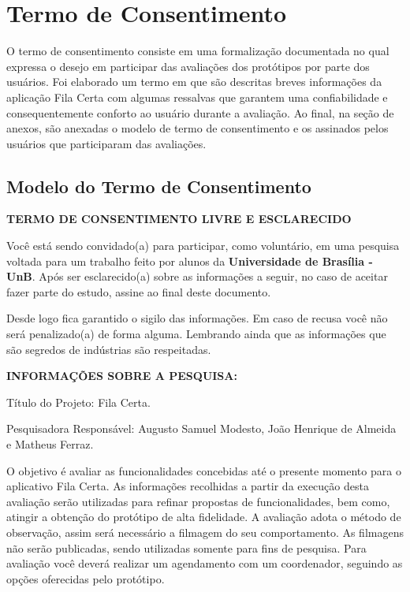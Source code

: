 \chapter[Termo de Consentimento]{Termo de Consentimento}
\label{chap:termoConsentimento}
	
	O termo de consentimento consiste em uma formalização documentada no qual expressa o desejo em participar das avaliações dos protótipos por parte dos usuários. Foi elaborado um termo em que são descritas breves informações da aplicação Fila Certa com algumas ressalvas que garantem uma confiabilidade e consequentemente conforto ao usuário durante a avaliação. Ao final, na seção de anexos, são anexadas o modelo de termo de consentimento e os assinados pelos usuários que participaram das avaliações. 

	\section[Modelo do Termo de Consentimento]{Modelo do Termo de Consentimento}
	\label{sec:termoConsentimento_modelo}

		\begin{center}
			\textbf{TERMO DE CONSENTIMENTO LIVRE E ESCLARECIDO}
		\end{center}

		Você está sendo convidado(a) para participar, como voluntário, em uma pesquisa voltada para um trabalho feito por alunos da \textbf{Universidade de Brasília - UnB}. Após ser esclarecido(a) sobre as informações a seguir, no caso de aceitar fazer parte do estudo, assine ao final deste documento.
		
		Desde logo fica garantido o sigilo das informações. Em caso de recusa você não será penalizado(a) de forma alguma. Lembrando ainda que as informações que são segredos de indústrias são respeitadas.

		\begin{center}
			\textbf{INFORMAÇÕES SOBRE A PESQUISA:}
		\end{center}
		
		\begin{flushleft}
			Título do Projeto: Fila Certa.
			
			Pesquisadora Responsável: Augusto Samuel Modesto, João Henrique de Almeida e Matheus Ferraz.
		\end{flushleft}

		O objetivo é avaliar as funcionalidades concebidas até o presente momento para o aplicativo Fila Certa. As informações recolhidas a partir da execução desta avaliação serão utilizadas para refinar propostas de funcionalidades, bem como, atingir a obtenção do protótipo de alta fidelidade.
		A avaliação adota o método de observação, assim será necessário a filmagem do seu comportamento. As filmagens não serão publicadas, sendo utilizadas somente para fins de pesquisa.
		Para avaliação você deverá realizar um agendamento com um coordenador, seguindo as opções oferecidas pelo protótipo. 


